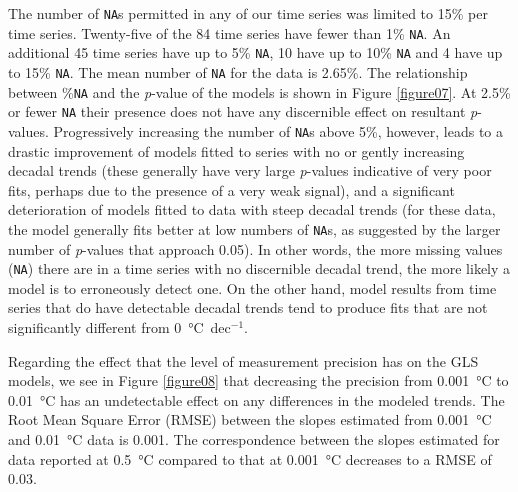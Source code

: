 \documentclass[]{ametsoc}
\begin{document}
The number of \texttt{NA}s permitted in any of our time series was limited to 15\% per time series. Twenty-five of the 84 time series have fewer than 1\% \texttt{NA}. An additional 45 time series have up to 5\% \texttt{NA}, 10 have up to 10\% \texttt{NA} and 4 have up to 15\% \texttt{NA}. The mean number of \texttt{NA} for the data is 2.65\%. The relationship between \%\texttt{NA} and the \emph{p}-value of the models is shown in Figure \ref{figure07}. At 2.5\% or fewer \texttt{NA} their presence does not have any discernible effect on resultant \emph{p}-values. Progressively increasing the number of \texttt{NA}s above 5\%, however, leads to a drastic improvement of models fitted to series with no or gently increasing decadal trends (these generally have very large \emph{p}-values indicative of very poor fits, perhaps due to the presence of a very weak signal), and a significant deterioration of models fitted to data with steep decadal trends (for these data, the model generally fits better at low numbers of \texttt{NA}s, as suggested by the larger number of \emph{p}-values that approach 0.05). In other words, the more missing values (\texttt{NA}) there are in a time series with no discernible decadal trend, the more likely a model is to erroneously detect one. On the other hand, model results from time series that do have detectable decadal trends tend to produce fits that are not significantly different from \SI{0}{\degreeCelsius}~dec$^{-1}$.

Regarding the effect that the level of measurement precision has on the GLS models, we see in Figure \ref{figure08} that decreasing the precision from \SI{0.001}{\degreeCelsius} to \SI{0.01}{\degreeCelsius} has an undetectable effect on any differences in the modeled trends. The Root Mean Square Error (RMSE) between the slopes estimated from \SI{0.001}{\degreeCelsius} and \SI{0.01}{\degreeCelsius} data is 0.001. The correspondence between the slopes estimated for data reported at \SI{0.5}{\degreeCelsius} compared to that at \SI{0.001}{\degreeCelsius} decreases to a RMSE of 0.03.
\end{document}
